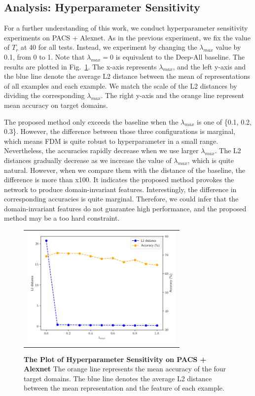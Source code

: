 \subsection{Analysis: Hyperparameter Sensitivity}
For a further understanding of this work, we conduct hyperparameter sensitivity experiments on PACS + Alexnet. As in the previous experiment, we fix the value of $T_r$ at 40 for all tests. Instead, we experiment by changing the $\lambda_{max}$ value by 0.1, from 0 to 1. Note that $\lambda_{max} = 0$ is equivalent to the Deep-All baseline. The results are plotted in Fig.~\ref{fig:analysis}. The x-axis represents $\lambda_{max}$, and the left y-axis and the blue line denote the average L2 distance between the mean of representations of all examples and each example. We match the scale of the L2 distances by dividing the corresponding $\lambda_{max}$. The right y-axis and the orange line represent mean accuracy on target domains. 

The proposed method only exceeds the baseline when the $\lambda_{max}$ is one of \{0.1, 0.2, 0.3\}. However, the difference between those three configurations is marginal, which means FDM is quite robust to hyperparameter in a small range. Nevertheless, the accuracies rapidly decrease when we use larger $\lambda_{max}$. The L2 distances gradually decrease as we increase the value of $\lambda_{max}$, which is quite natural. However, when we compare them with the distance of the baseline, the difference is more than x100. It indicates the proposed method provokes the network to produce domain-invariant features. Interestingly, the difference in corresponding accuracies is quite marginal. Therefore, we could infer that the domain-invariant features do not guarantee high performance, and the proposed method may be a too hard constraint.

\begin{figure}[t]
	\centering
	\footnotesize
	\begin{tabular}{c}
		\includegraphics[width=8cm]{figures/analysis.png}
	\end{tabular}
	\vspace{-0.3cm}
	\caption{\textbf{The Plot of Hyperparameter Sensitivity on PACS + Alexnet} The orange line represents the mean accuracy of the four target domains. The blue line denotes the average L2 distance between the mean representation and the feature of each example.}\label{fig:analysis}
\end{figure}


